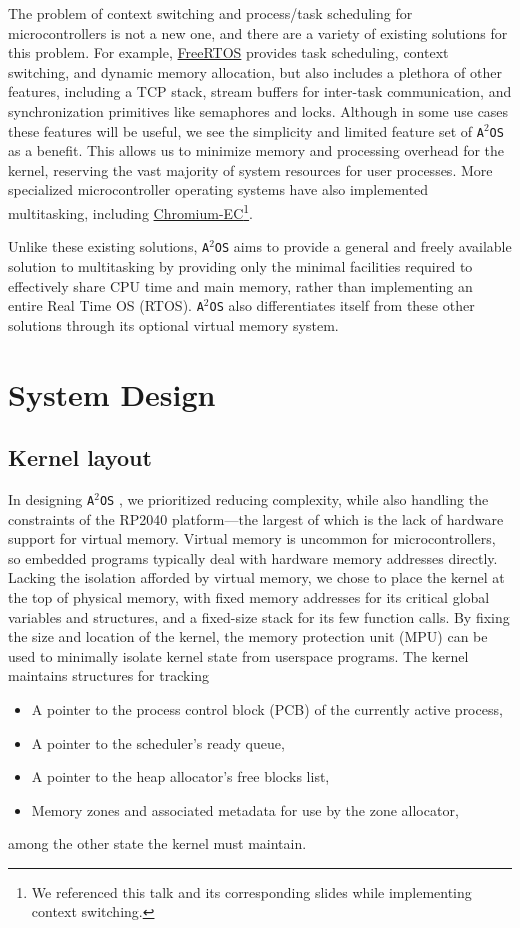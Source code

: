 \documentclass[12pt]{article}
\newcommand{\os}{\texttt{A$^2$OS} }
\begin{document}
The problem of context switching and process/task scheduling for
microcontrollers is not a new one, and there are a variety of existing solutions
for this problem. For example,
\href{https://www.freertos.org/Documentation/02-Kernel/02-Kernel-features/01-Tasks-and-co-routines/00-Tasks-and-co-routines#characteristics-of-a-task}{FreeRTOS}
provides task scheduling, context switching, and dynamic memory allocation, but
also includes a plethora of other features, including a TCP stack, stream
buffers for inter-task communication, and synchronization primitives like
semaphores and locks. Although in some use cases these features will be useful,
we see the simplicity and limited feature set of \os as a benefit. This allows
us to minimize memory and processing overhead for the kernel, reserving the vast
majority of system resources for user processes. More specialized
microcontroller operating systems have also implemented multitasking, including
\href{https://www.youtube.com/watch?v=yHqaspeGJRw}{Chromium-EC}\footnote{We
referenced this talk and its corresponding slides while implementing context
switching.}.

Unlike these existing solutions, \os aims to provide a general and freely
available solution to multitasking by providing only the minimal facilities
required to effectively share CPU time and main memory, rather than implementing
an entire Real Time OS (RTOS). \os also differentiates itself from these other
solutions through its optional virtual memory system.


\section{System Design}
\subsection{Kernel layout}
In designing \os, we prioritized reducing complexity, while also handling the
constraints of the RP2040 platform---the largest of which is the lack of
hardware support for virtual memory. Virtual memory is uncommon for
microcontrollers, so embedded programs typically deal with hardware memory
addresses directly. Lacking the isolation afforded by virtual memory, we chose
to place the kernel at the top of physical memory, with fixed memory addresses
for its critical global variables and structures, and a fixed-size stack for its
few function calls. By fixing the size and location of the kernel, the memory
protection unit (MPU) can be used to minimally isolate kernel state from
userspace programs. The kernel maintains structures for tracking
\begin{itemize}
    \item {A pointer to the process control block (PCB) of the currently active
    process,}
    \item A pointer to the scheduler's ready queue,
    \item A pointer to the heap allocator's free blocks list,
    \item Memory zones and associated metadata for use by the zone allocator,
\end{itemize}
among the other state the kernel must maintain.
\end{document}
